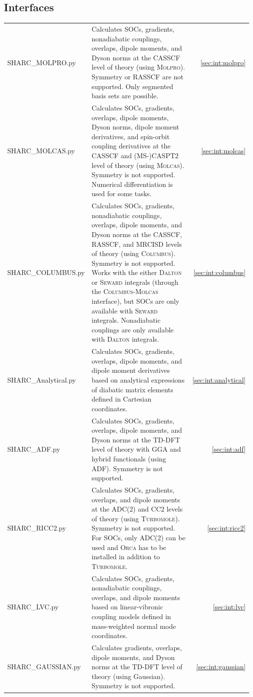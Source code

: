 \documentclass[a4paper,10pt,DIV=15,openany,twoside=false]{scrbook}
\begin{document}
\subsection{Interfaces}

\begin{tabular}{>{\ttfamily}lp{10.5cm}r}
  SHARC\_MOLPRO.py      &Calculates SOCs, gradients, nonadiabatic couplings, overlaps,     dipole moments, and Dyson norms at the CASSCF level of theory (using \textsc{Molpro}). Symmetry or RASSCF are not supported. Only segmented basis sets are possible.   &\ref{sec:int:molpro}\\
  SHARC\_MOLCAS.py      &Calculates SOCs, gradients,                         overlaps,     dipole moments,     Dyson norms, dipole moment derivatives, and spin-orbit coupling derivatives at the CASSCF and (MS-)CASPT2 level of theory (using \textsc{Molcas}). Symmetry is not supported. Numerical differentiation is used for some tasks.   &\ref{sec:int:molcas}\\
  SHARC\_COLUMBUS.py    &Calculates SOCs, gradients, nonadiabatic couplings, overlaps,     dipole moments, and Dyson norms at the CASSCF, RASSCF, and MRCISD levels of theory (using \textsc{Columbus}). Symmetry is not supported. Works with the either \textsc{Dalton} or \textsc{Seward} integrals (through the \textsc{Columbus}-\textsc{Molcas} interface), but SOCs are only available with \textsc{Seward} integrals. Nonadiabatic couplings are only available with \textsc{Dalton} integrals.                &\ref{sec:int:columbus}\\
  SHARC\_Analytical.py  &Calculates SOCs, gradients,                         overlaps,     dipole moments, and              dipole moment derivatives based on analytical expressions of diabatic matrix elements defined in Cartesian coordinates.       &\ref{sec:int:analytical}\\
  SHARC\_ADF.py         &Calculates SOCs, gradients,                         overlaps,     dipole moments, and Dyson norms at the TD-DFT level of theory with GGA and hybrid functionals (using \textsc{ADF}). Symmetry is not supported.  &\ref{sec:int:adf}\\
  SHARC\_RICC2.py       &Calculates SOCs, gradients,                         overlaps, and dipole moments at the ADC(2) and CC2 levels of theory (using \textsc{Turbomole}). Symmetry is not supported. For SOCs, only ADC(2) can be used and \textsc{Orca} has to be installed in addition to \textsc{Turbomole}.        &\ref{sec:int:ricc2}\\
  SHARC\_LVC.py         &Calculates SOCs, gradients, nonadiabatic couplings, overlaps, and dipole moments based on linear-vibronic coupling models defined in mass-weighted normal mode coordinates.         &\ref{sec:int:lvc}\\
  SHARC\_GAUSSIAN.py    &Calculates       gradients,                         overlaps,     dipole moments, and Dyson norms at the TD-DFT level of theory (using Gaussian). Symmetry is not supported.  &\ref{sec:int:gaussian}\\
\end{tabular}
\end{document}
